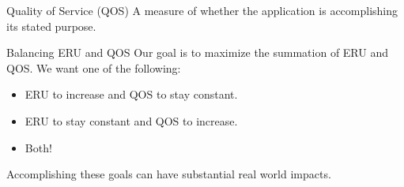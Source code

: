 \documentclass{beamer}
\begin{document}
\begin{frame}{Quality of Service (QOS)}
  A measure of whether the application is accomplishing its stated purpose.


\end{frame}

\begin{frame}{Balancing ERU and QOS}
  Our goal is to maximize the summation of ERU and QOS. We want one of the
  following:

  \begin{itemize}
    \item ERU to increase and QOS to stay constant.
    \item ERU to stay constant and QOS to increase.
    \item Both!
  \end{itemize}

  Accomplishing these goals can have substantial real world impacts.



\end{frame}
\end{document}
